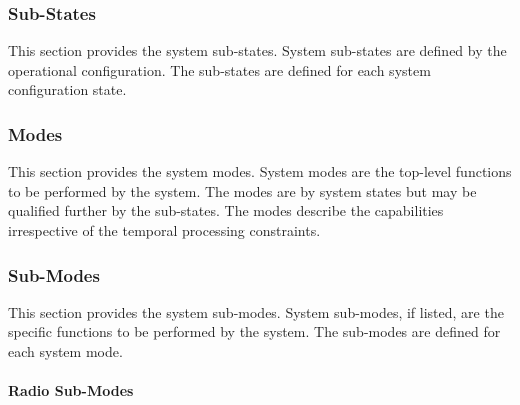 

\subsubsection{Sub-States}
\label{loc:medium_substates}

This section provides the system sub-states.
System sub-states are defined by the operational configuration.
The sub-states are defined for each system configuration state.




\subsubsection{Modes}
\label{loc:medium_modes}

This section provides the system modes.
System modes are the top-level functions to be performed by the system.
The modes are by system states but may be qualified further by the sub-states.
The modes describe the capabilities irrespective of the temporal processing constraints.




\subsubsection{Sub-Modes}
\label{loc:medium_submodes}

This section provides the system sub-modes.
System sub-modes, if listed, are the specific functions to be performed by the system.
The sub-modes are defined for each system mode.


\paragraph{Radio Sub-Modes}
\label{loc:MediumRadioSubMode}

